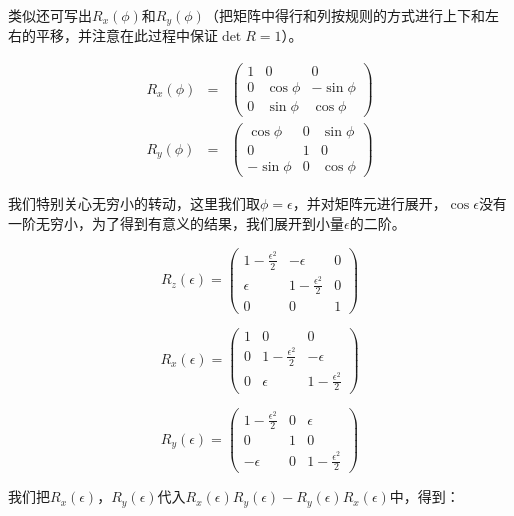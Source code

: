 类似还可写出$R_x (\phi)$和$R_y (\phi)$（把矩阵中得行和列按规则的方式进行上下和左右的平移，并注意在此过程中保证$\det R = 1$）。

\begin{eqnarray}
R_x (\phi) & = & \left( \begin{array}{ccc} 1 & 0 & 0 \\ 0 & \cos \phi & - \sin \phi \\ 0 & \sin \phi & \cos \phi \end{array} \right) \\
R_y (\phi) & = & \left( \begin{array}{ccc} \cos \phi & 0 & \sin \phi \\ 0 & 1 & 0 \\ - \sin \phi & 0 & \cos \phi \end{array} \right)
\end{eqnarray}

我们特别关心无穷小的转动，这里我们取$\phi = \epsilon$，并对矩阵元进行展开，$\cos \epsilon$没有一阶无穷小，为了得到有意义的结果，我们展开到小量$\epsilon$的二阶。

\begin{equation}
R_z (\epsilon) = \left( \begin{array}{ccc} 1- \frac{\epsilon^2}{2} & - \epsilon & 0 \\ \epsilon & 1- \frac{ \epsilon^2 }{2} & 0 \\ 0 & 0 & 1 \end{array} \right)
\end{equation}

\begin{equation}
R_x (\epsilon) = \left( \begin{array}{ccc} 1 & 0 & 0 \\ 0 & 1- \frac{ \epsilon^2 }{2} & - \epsilon \\ 0 & \epsilon & 1 - \frac{\epsilon^2}{2} \end{array} \right)
\end{equation}

\begin{equation}
R_y (\epsilon) = \left( \begin{array}{ccc} 1- \frac{\epsilon^2}{2} & 0 & \epsilon \\ 0 & 1 & 0 \\  - \epsilon & 0 & 1 - \frac{\epsilon^2}{2} \end{array} \right)
\end{equation}

我们把$R_x(\epsilon)$，$R_y(\epsilon)$代入$R_x (\epsilon) R_y (\epsilon) - R_y (\epsilon) R_x (\epsilon) $中，得到：

